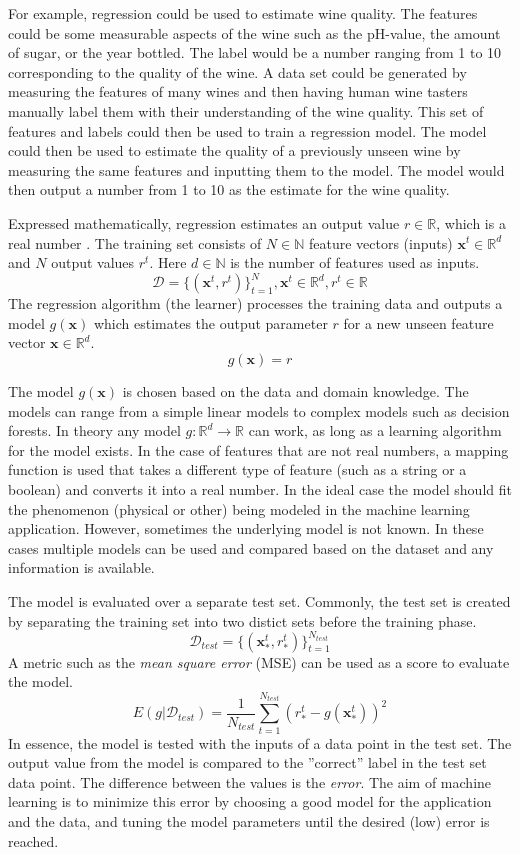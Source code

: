 For example, regression could be used to estimate wine quality.
The features could be some measurable aspects of the wine such as the pH-value, the amount of sugar, or the year bottled.
The label would be a number ranging from 1 to 10 corresponding to the quality of the wine.
A data set could be generated by measuring the features of many wines and then having human wine tasters manually label them with their understanding of the wine quality.
This set of features and labels could then be used to train a regression model.
The model could then be used to estimate the quality of a previously unseen wine by measuring the same features and inputting them to the model.
The model would then output a number from 1 to 10 as the estimate for the wine quality.

Expressed mathematically, regression estimates an output value $r \in \mathbb{R}$, which is a real number \cite{alpaydin}.
The training set consists of $N \in \mathbb{N}$ feature vectors (inputs) $\mathbf{x}^t \in \mathbb{R}^d$ and $N$ output values $r^t$.
Here $d \in \mathbb{N}$ is the number of features used as inputs.
$$\mathcal{D} = \{(\mathbf{x}^t, r^t)\}_{t=1}^N, \mathbf{x}^t \in \mathbb{R}^d, r^t \in \mathbb{R}$$
The regression algorithm (the learner) processes the training data and outputs a model $g(\mathbf{x})$ which estimates the output parameter $r$ for a new unseen feature vector $\mathbf{x} \in \mathbb{R}^d$.
$$g(\mathbf{x}) = r$$

The model $g(\mathbf{x})$ is chosen based on the data and domain knowledge. 
The models can range from a simple linear models to complex models such as decision forests.
In theory any model $g: \mathbb{R}^d \rightarrow \mathbb{R}$ can work,
as long as a learning algorithm for the model exists.
In the case of features that are not real numbers, a mapping function is used that takes a different type of feature (such as a string or a boolean) and converts it into a real number.
In the ideal case the model should fit the phenomenon (physical or other) being modeled in the machine learning application.
However, sometimes the underlying model is not known. 
In these cases multiple models can be used and compared based on the dataset and any information is available.

The model is evaluated over a separate test set.
Commonly, the test set is created by separating the training set into two distict sets before the training phase.
$$\mathcal{D}_{test} = \{ (\mathbf{x}_*^t , r_*^t) \}_{t=1}^{N_{test}}$$
A metric such as the \emph{mean square error} (MSE) can be used as a score to evaluate the model. \cite{alpaydin}
$$E(g | \mathcal{D}_{test}) = \frac{1}{N_{test}} \sum_{t=1}^{N_{test}} (r_*^t - g(\mathbf{x}_*^t))^2$$
In essence, the model is tested with the inputs of a data point in the test set. The output value from the model is compared to the ''correct'' label in the test set data point.
The difference between the values is the \emph{error}.
The aim of machine learning is to minimize this error by choosing a good model for the application and the data, and tuning the model parameters until the desired (low) error is reached.

